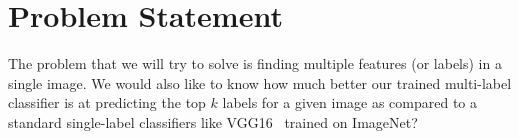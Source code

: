 \documentclass[10pt, a4paper, twocolumn]{article} %
\begin{document}
\section{Problem Statement}\label{sec:2} %


The problem that we will try to solve is finding multiple features (or labels) in a single image. We would also like to know how much better our trained multi-label classifier is at predicting the top $k$ labels for a given image as compared to a standard single-label classifiers like VGG16~\cite{SimonyanZ14a} trained on ImageNet?


\end{document}
